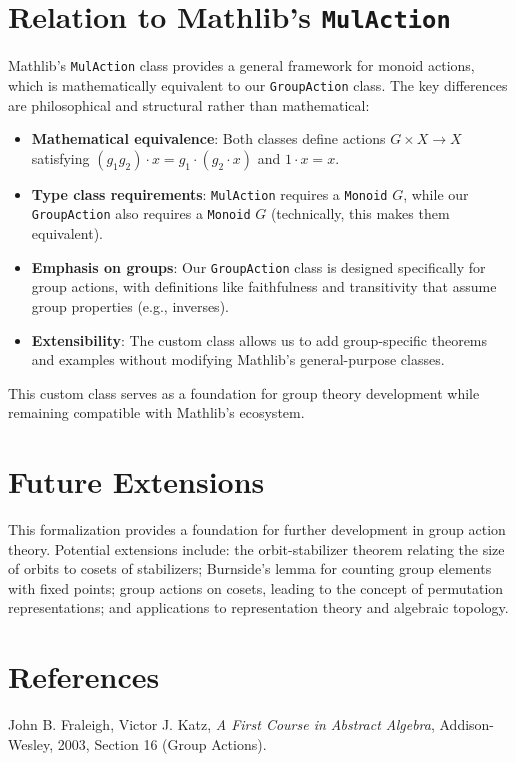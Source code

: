 \documentclass[
  12pt, %
]{assignment}
\begin{document}
	\section{Relation to Mathlib's \texttt{MulAction}}
	Mathlib's \texttt{MulAction} class provides a general framework for monoid actions, which is mathematically equivalent to our \texttt{GroupAction} class. The key differences are philosophical and structural rather than mathematical:

	\begin{itemize}
		\item \textbf{Mathematical equivalence}: Both classes define actions $G \times X \to X$ satisfying $(g_1 g_2) \cdot x = g_1 \cdot (g_2 \cdot x)$ and $1 \cdot x = x$.

		\item \textbf{Type class requirements}: \texttt{MulAction} requires a \texttt{Monoid} $G$, while our \texttt{GroupAction} also requires a \texttt{Monoid} $G$ (technically, this makes them equivalent).

		\item \textbf{Emphasis on groups}: Our \texttt{GroupAction} class is designed specifically for group actions, with definitions like faithfulness and transitivity that assume group properties (e.g., inverses).

		\item \textbf{Extensibility}: The custom class allows us to add group-specific theorems and examples without modifying Mathlib's general-purpose classes.
	\end{itemize}

	This custom class serves as a foundation for group theory development while remaining compatible with Mathlib's ecosystem.
\fi

\section{Future Extensions}
This formalization provides a foundation for further development in group action theory. Potential extensions include: the orbit-stabilizer theorem relating the size of orbits to cosets of stabilizers; Burnside's lemma for counting group elements with fixed points; group actions on cosets, leading to the concept of permutation representations; and applications to representation theory and algebraic topology.
\section{References}
John B. Fraleigh, Victor J. Katz, \textit{A First Course in Abstract Algebra},
Addison-Wesley, 2003, Section 16 (Group Actions).
\end{document}
